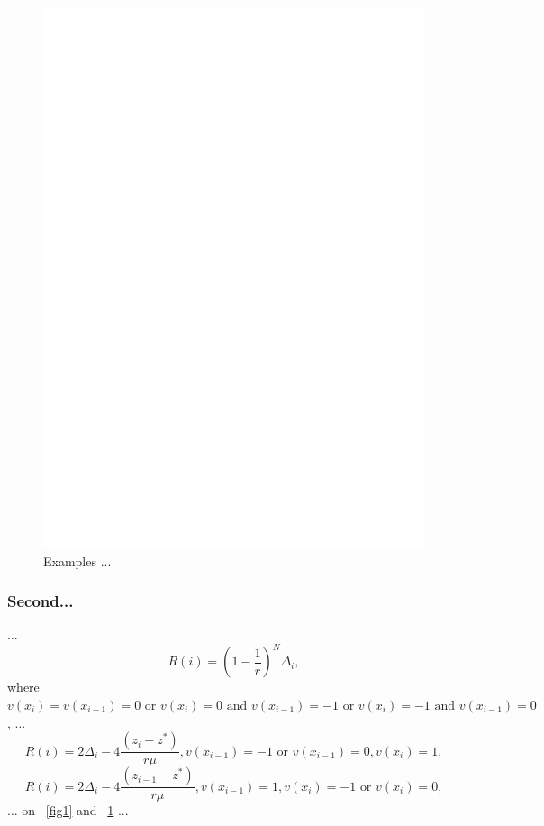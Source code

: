 \documentclass[runningheads]{llncs}
\begin{document}
\begin{figure}
\includegraphics[width=\textwidth]{fig1.pdf}
\caption{Examples ... } \label{fig2}
\end{figure}

\subsubsection{Second...} ... 
\begin{equation}
R(i)={(1- \frac {1}{r})}^N \Delta _i,
\end{equation}
where $v(x_i)=v(x_{i-1})=0 \text{ or } v(x_i)=0 \text{ and } v(x_{i-1})=-1  \text{ or } v(x_i)=-1 \text{ and } v(x_{i-1})=0$, ...
\begin{equation}
R(i)=2\Delta _i-4 \frac {(z_i-z^*)}{r \mu}, v(x_{i-1})=-1  \text{ or } v(x_{i-1})=0, v(x_i)=1,
\end{equation}
\begin{equation}
R(i)=2\Delta _i-4 \frac {(z_{i-1}-z^*)}{r \mu}, v(x_{i-1})=1, v(x_i)=-1 \text{ or } v(x_i)=0,
\end{equation}
... on ~\ref{fig1} and ~\ref{fig2} ...
\end{document}
